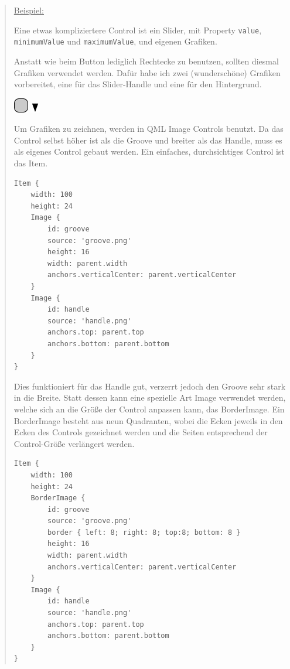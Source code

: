 \documentclass[a4paper]{article}
\begin{document}
\begin{quote}
\uline{Beispiel:}

Eine etwas kompliziertere Control ist ein Slider, mit Property \verb~value~, \verb~minimumValue~ und \verb~maximumValue~, und eigenen Grafiken.

Anstatt wie beim Button lediglich Rechtecke zu benutzen, sollten diesmal Grafiken verwendet werden. Dafür habe ich zwei (wunderschöne) Grafiken vorbereitet, eine für das Slider-Handle und eine für den Hintergrund.

\includegraphics[width=24px]{images/groove.png}
\includegraphics[width=16px]{images/handle.png}

Um Grafiken zu zeichnen, werden in QML Image Controls benutzt. Da das Control selbst höher ist als die Groove und breiter als das Handle, muss es als eigenes Control gebaut werden. Ein einfaches, durchsichtiges Control ist das Item.

\begin{verbatim}
Item {
    width: 100
    height: 24
    Image {
        id: groove
        source: 'groove.png'
        height: 16
        width: parent.width
        anchors.verticalCenter: parent.verticalCenter
    }
    Image {
        id: handle
        source: 'handle.png'
        anchors.top: parent.top
        anchors.bottom: parent.bottom
    }
}
\end{verbatim}

Dies funktioniert für das Handle gut, verzerrt jedoch den Groove sehr stark in die Breite. Statt dessen kann eine spezielle Art Image verwendet werden, welche sich an die Größe der Control anpassen kann, das BorderImage. Ein BorderImage besteht aus neun Quadranten, wobei die Ecken jeweils in den Ecken des Controls gezeichnet werden und die Seiten entsprechend der Control-Größe verlängert werden.

\begin{verbatim}
Item {
    width: 100
    height: 24
    BorderImage {
        id: groove
        source: 'groove.png'
        border { left: 8; right: 8; top:8; bottom: 8 }
        height: 16
        width: parent.width
        anchors.verticalCenter: parent.verticalCenter
    }
    Image {
        id: handle
        source: 'handle.png'
        anchors.top: parent.top
        anchors.bottom: parent.bottom
    }
}
\end{verbatim}


\end{quote}
\end{document}
